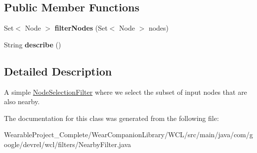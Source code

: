 \subsection*{Public Member Functions}
\begin{DoxyCompactItemize}
\item 
Set$<$ Node $>$ {\bfseries filter\+Nodes} (Set$<$ Node $>$ nodes)\hypertarget{classcom_1_1google_1_1devrel_1_1wcl_1_1filters_1_1NearbyFilter_ae0d1ca9804e1de418fd3ffe638c00ac0}{}\label{classcom_1_1google_1_1devrel_1_1wcl_1_1filters_1_1NearbyFilter_ae0d1ca9804e1de418fd3ffe638c00ac0}

\item 
String {\bfseries describe} ()\hypertarget{classcom_1_1google_1_1devrel_1_1wcl_1_1filters_1_1NearbyFilter_ae4a844da361fafcf7c7fb6bc9fdb2e0e}{}\label{classcom_1_1google_1_1devrel_1_1wcl_1_1filters_1_1NearbyFilter_ae4a844da361fafcf7c7fb6bc9fdb2e0e}

\end{DoxyCompactItemize}


\subsection{Detailed Description}
A simple \hyperlink{interfacecom_1_1google_1_1devrel_1_1wcl_1_1filters_1_1NodeSelectionFilter}{Node\+Selection\+Filter} where we select the subset of input nodes that are also nearby. 

The documentation for this class was generated from the following file\+:\begin{DoxyCompactItemize}
\item 
Wearable\+Project\+\_\+\+Complete/\+Wear\+Companion\+Library/\+W\+C\+L/src/main/java/com/google/devrel/wcl/filters/Nearby\+Filter.\+java\end{DoxyCompactItemize}
